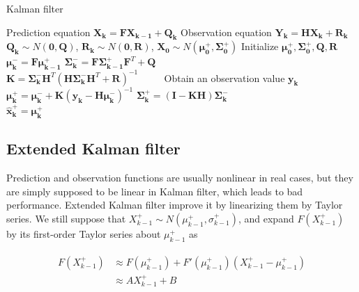 \documentclass[conference]{IEEEtran}
\begin{document}
	\begin{algorithm}
		\caption{Kalman filter}
		\begin{algorithmic}  
			\STATE Prediction equation $\boldsymbol{X_{k}}=\boldsymbol{F}\boldsymbol{X_{k-1}}+\boldsymbol{Q_{k}}$
			\STATE Observation equation $\boldsymbol{Y_{k}}=\boldsymbol{H}\boldsymbol{X_{k}}+\boldsymbol{R_{k}}$
			\STATE $\boldsymbol{Q_{k}}\sim N(\boldsymbol{0},\boldsymbol{Q})$, $\boldsymbol{R_{k}}\sim N(\boldsymbol{0},\boldsymbol{R})$, $\boldsymbol{X_{0}}\sim N(\boldsymbol{\mu_{0}^{+}}, \boldsymbol{\Sigma_{0}^{+}})$
			\STATE Initialize $ \boldsymbol{\mu_{0}^{+}}, \boldsymbol{\Sigma_{0}^{+}}, \boldsymbol{Q}, \boldsymbol{R}$
			\STATE $\boldsymbol{\mu_{k}^{-}}=\boldsymbol{F}\boldsymbol{\mu_{k-1}^{+}}$ 
			\STATE $\boldsymbol{\Sigma_{k}^{-}}=\boldsymbol{F}\boldsymbol{\Sigma_{k-1}^{+}}\boldsymbol{F}^{T}+\boldsymbol{Q}$ \ \ \ \ \ \ \ \ \ \ \ \ \ \ \ \ \ \ \ \ 
			\STATE $\boldsymbol{K}=\boldsymbol{\Sigma_{k}^{-}}\boldsymbol{H}^{T}(\boldsymbol{H}\boldsymbol{\Sigma_{k}^{-}}\boldsymbol{H}^{T}+\boldsymbol{R})^{-1}$ \ \ \ \ 	
			\STATE Obtain an observation value $\boldsymbol{y_{k}}$
			\STATE $\boldsymbol{\mu_{k}^{+}}=\boldsymbol{\mu_{k}^{-}}+\boldsymbol{K}(\boldsymbol{y_{k}}-\boldsymbol{H}\boldsymbol{\mu_{k}^{-}})^{-1}$
			\STATE $\boldsymbol{\Sigma_{k}^{+}}=(\boldsymbol{I}-\boldsymbol{KH})\boldsymbol{\Sigma_{k}^{-}}$ \ \ \ \ \ \ \ \ \ \ \ \ \ \ \ \ \ \ \ \ \ \ \ 
			\STATE $\boldsymbol{\hat{x}_{k}^{+}}=\boldsymbol{\mu_{k}^{+}}$
			\ENDFOR
		\end{algorithmic}
	\end{algorithm}
	
	\subsection{Extended Kalman filter}
	
	Prediction and observation functions are usually nonlinear in real cases, but they are simply supposed to be linear in Kalman filter, which leads to bad performance. Extended Kalman filter improve it by linearizing them by Taylor series. We still suppose that $X_{k-1}^{+}\sim N(\mu_{k-1}^{+}, \sigma_{k-1}^{+})$, and expand $F(X_{k-1}^{+})$ by its first-order Taylor series about $\mu_{k-1}^{+}$ as
	
	\begin{equation}
	\begin{split}
	\begin{aligned}
	F(X_{k-1}^{+})&\approx F(\mu_{k-1}^{+})+{F}'(\mu_{k-1}^{+})(X_{k-1}^{+}-\mu_{k-1}^{+})\\
	&\approx AX_{k-1}^{+}+B
	\label{eq12}
	\end{aligned}
	\end{split}
	\end{equation}
	
\end{document}
